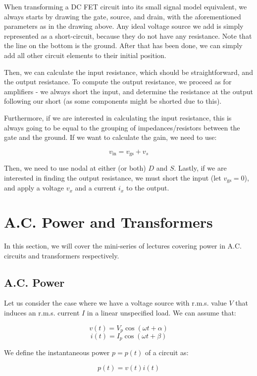 \documentclass{article}
\begin{document}
When transforming a DC FET circuit into its small signal model equivalent, we always starts by drawing the gate, source, and drain, with the aforementioned parameters as in the drawing above. Any ideal voltage source we add is simply represented as a short-circuit, because they do not have any resistance. Note that the line on the bottom is the ground. After that has been done, we can simply add all other circuit elements to their initial position.

Then, we can calculate the input resistance, which should be straightforward, and the output resistance. To compute the output resistance, we proceed as for amplifiers - we always short the input, and determine the resistance at the output following our short (as some components might be shorted due to this).

Furthermore, if we are interested in calculating the input resistance, this is always going to be equal to the grouping of impedances/resistors between the gate and the ground. If we want to calculate the gain, we need to use:

\[ v_\text{in} = v_\text{gs} + v_s \]

Then, we need to use nodal at either (or both) $D$ and $S$. Lastly, if we are interested in finding the output resistance, we must short the input (let $v_\text{gs} = 0$), and apply a voltage $v_x$ and a current $i_x$ to the output.

\newpage

\section{A.C. Power and Transformers}

In this section, we will cover the mini-series of lectures covering power in A.C. circuits and transformers respectively.

\subsection{A.C. Power}

Let us consider the case where we have a voltage source with r.m.s. value $V$ that induces an r.m.s. current $I$ in a linear unspecified load. We can assume that:

\[ v(t) = V_p\cos{(\omega t + \alpha)} \]
\[ i(t) = I_p\cos{(\omega t + \beta)} \]

\begin{definition}
    We define the instantaneous power $p = p(t)$ of a circuit as:

    \[ p(t) = v(t)i(t) \]
\end{definition}
\end{document}
